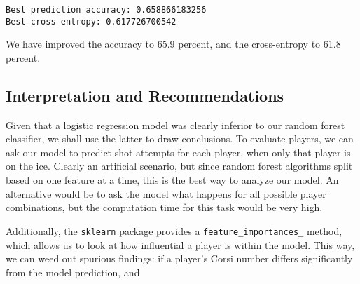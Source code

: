 \documentclass[11pt]{article}
\begin{document}
    \begin{Verbatim}[commandchars=\\\{\}]
Best prediction accuracy: 0.658866183256
Best cross entropy: 0.617726700542

    \end{Verbatim}

    We have improved the accuracy to 65.9 percent, and the cross-entropy to
61.8 percent.

    \subsection{Interpretation and
Recommendations}\label{interpretation-and-recommendations}

    Given that a logistic regression model was clearly inferior to our
random forest classifier, we shall use the latter to draw conclusions.
To evaluate players, we can ask our model to predict shot attempts for
each player, when only that player is on the ice. Clearly an artificial
scenario, but since random forest algorithms split based on one feature
at a time, this is the best way to analyze our model. An alternative
would be to ask the model what happens for all possible player
combinations, but the computation time for this task would be very high.

Additionally, the \texttt{sklearn} package provides a
\texttt{feature\_importances\_} method, which allows us to look at how
influential a player is within the model. This way, we can weed out
spurious findings: if a player's Corsi number differs significantly from
the model prediction, and
\end{document}
